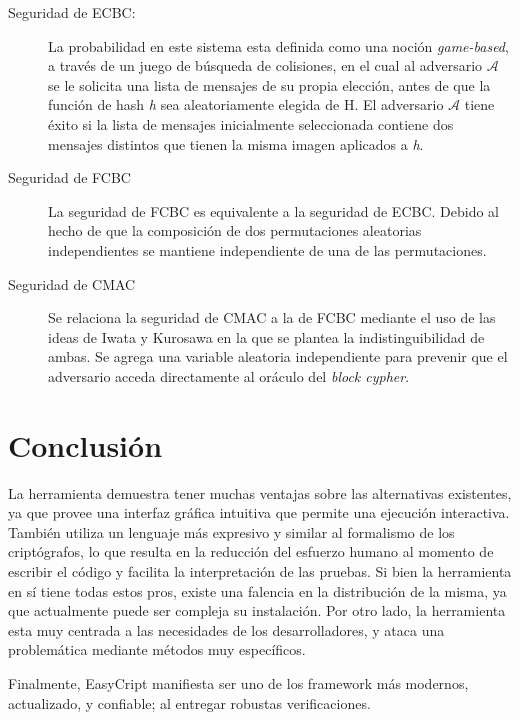 \documentclass[runningheads]{llncs}
\begin{document}
\begin{description}
\item[Seguridad de ECBC:] La probabilidad en este sistema esta definida como una noción \textit{game-based}, a través de un juego de búsqueda de colisiones, en el cual al adversario $\mathcal{A}$ se le solicita una lista de mensajes de su propia elección, antes de que la función de hash \textit{h} sea aleatoriamente elegida de H. El adversario $\mathcal{A}$ tiene éxito si la lista de mensajes inicialmente seleccionada contiene dos mensajes distintos que tienen la misma imagen aplicados a \textit{h}.

\item[Seguridad de FCBC] La seguridad de FCBC es equivalente a la seguridad de ECBC. Debido al hecho de que la composición de dos permutaciones aleatorias independientes se mantiene independiente de una de las permutaciones.

\item[Seguridad de CMAC] Se relaciona la seguridad de CMAC a la de FCBC mediante el uso de las ideas de Iwata y Kurosawa en la que se plantea la indistinguibilidad de ambas. Se agrega una variable aleatoria independiente para prevenir que el adversario acceda directamente al oráculo del \textit{block cypher}.
\end{description}

\section{Conclusión}

La herramienta demuestra tener muchas ventajas sobre las alternativas existentes, ya que provee una interfaz gráfica intuitiva que permite una ejecución interactiva. También utiliza un lenguaje más expresivo y similar al formalismo de los criptógrafos, lo que resulta en la reducción del esfuerzo humano al momento de escribir el código y facilita la interpretación de las pruebas. Si bien la herramienta en sí tiene todas estos pros, existe una falencia en la distribución de la misma, ya que actualmente puede ser compleja su instalación. Por otro lado, la herramienta esta muy centrada a las necesidades de los desarrolladores, y ataca una problemática mediante métodos muy específicos.

Finalmente, EasyCript manifiesta ser uno de los framework más modernos, actualizado, y confiable; al entregar robustas verificaciones.
\end{document}
